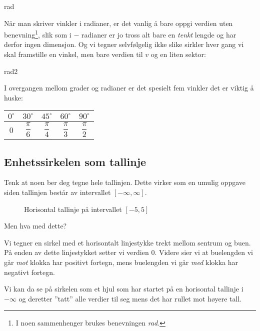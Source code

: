 {rad}

Når man skriver vinkler i radianer, er det vanlig å bare oppgi verdien uten benevning\footnote{I noen sammenhenger brukes benevningen \textit{rad}.}, slik som i  $ - $ radianer er jo tross alt bare en \textit{tenkt} lengde og har derfor ingen dimensjon. Og vi tegner selvfølgelig ikke slike sirkler hver gang vi skal framstille en vinkel, men bare  verdien til $ v $ og en liten sektor:

{rad2}

I overgangen mellom grader og radianer er det spesielt fem vinkler det er viktig å huske: 

{	\centering
	\renewcommand{\arraystretch}{2}	
	\begin{tabular}{c|c|c|c|c}
		$ 0^\circ $ & $ 30^\circ $& $45^\circ$ & $ 60^\circ $ & $ 90^\circ$ \\
		\hline
		0&$\dfrac{\pi}{6}$ & $\dfrac{\pi}{4}$ &$\dfrac{\pi}{3}$ & $\dfrac{\pi}{2}$    \\	 
	\end{tabular}
	}\regv
\rad
\subsection{Enhetssirkelen som tallinje}
Tenk at noen ber deg tegne hele tallinjen. Dette virker som en umulig oppgave siden tallinjen består av intervallet $ [-\infty, \infty] $. 

\begin{figure}
	\centering
{}
\caption{Horisontal tallinje på intervallet $ [-5, 5] $}
\end{figure}

Men hva med dette?\regv

Vi tegner en sirkel med et horisontalt linjestykke trekt mellom sentrum og buen. På enden av dette linjestykket setter vi verdien 0. Videre sier vi at buelengden vi går \textit{mot} klokka har positivt fortegn, mens buelengden vi går \textit{med} klokka har negativt fortegn. 



Vi kan da se på sirkelen som et hjul som har startet på en horisontal tallinje i $ -\infty $ og deretter ''tatt'' alle verdier til seg mens det har rullet mot høyere tall.

